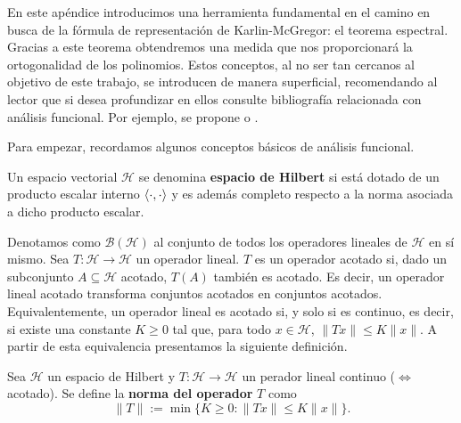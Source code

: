 
    
    En este apéndice introducimos una herramienta fundamental en el camino en busca de la fórmula de representación de Karlin-McGregor: el teorema espectral. Gracias a este teorema obtendremos una medida que nos proporcionará la ortogonalidad de los polinomios. Estos conceptos, al no ser tan cercanos al objetivo de este trabajo, se introducen de manera superficial, recomendando al lector que si desea profundizar en ellos consulte bibliografía relacionada con análisis funcional. Por ejemplo, se propone \cite[Ch. 1]{Manuel} o \cite[Ch. 12]{rudin}.

    
    Para empezar, recordamos algunos conceptos básicos de análisis funcional.

    \begin{definicion}
        Un espacio vectorial $\mathcal{H}$ se denomina \textbf{espacio de Hilbert} si está dotado de un producto escalar interno $\left\langle \cdot , \cdot \right\rangle$ y es además completo respecto a la norma asociada a dicho producto escalar.
    \end{definicion}

    Denotamos como $\mathcal{B}(\mathcal{H})$ al conjunto de todos los operadores lineales de $\mathcal{H}$ en sí mismo. Sea $T:\mathcal H \longrightarrow \mathcal{H}$ un operador lineal. $T$ es un operador acotado si, dado un subconjunto $A\subseteq \mathcal{H}$ acotado, $T(A)$ también es acotado. Es decir, un operador lineal acotado transforma conjuntos acotados en conjuntos acotados. Equivalentemente, un operador lineal es acotado si, y solo si es continuo, es decir, si existe una constante $K\geq 0$ tal que, para todo $x\in\mathcal H$, $\|Tx\|\leq K\|x\|$. A partir de esta equivalencia presentamos la siguiente definición.

    \begin{definicion}
        Sea $\mathcal{H}$ un espacio de Hilbert y $T:\mathcal H \longrightarrow \mathcal{H}$ un perador lineal continuo ($\Leftrightarrow$ acotado). Se define la \textbf{norma del operador} $T$ como
        \begin{equation}
            \label{eq:norma-operadores}
            \|T\|:= \min\{K\geq 0: \|Tx\|\leq K\|x\|\}.
        \end{equation}
    \end{definicion}

